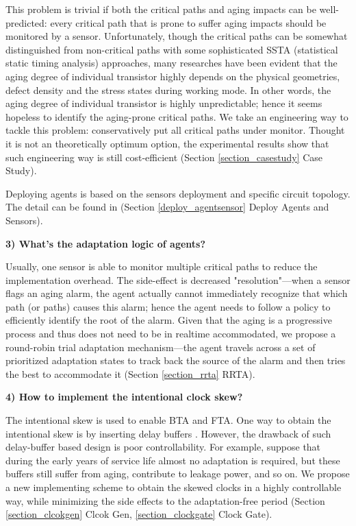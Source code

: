 This problem is trivial if both the critical paths and aging impacts can be well-predicted: every critical path that is prone to suffer aging impacts should be monitored by a sensor. Unfortunately, though the critical paths can be somewhat distinguished from non-critical paths with some sophisticated SSTA (statistical static timing analysis) approaches, many researches have been evident that the aging degree of individual transistor highly depends on the physical geometries, defect density and the stress states during working mode. In other words, the aging degree of individual transistor is highly unpredictable; hence it seems hopeless to identify the aging-prone critical paths. We take an engineering way to tackle this problem: conservatively put all critical paths under monitor. Thought it is not an theoretically optimum option, the experimental results show that such engineering way is still cost-efficient (Section \ref{section_casestudy} Case Study).

Deploying agents is based on the sensors deployment and specific circuit topology. The detail can be found in (Section \ref{deploy_agentsensor} Deploy Agents and Sensors).

{\bf 3) What's the adaptation logic of agents?}

Usually, one sensor is able to monitor multiple critical paths to reduce the implementation overhead. The side-effect is decreased "resolution"---when a sensor flags an aging alarm, the agent actually cannot immediately recognize that which path (or paths) causes this alarm; hence the agent needs to follow a policy to efficiently identify the root of the alarm. Given that the aging is a progressive process and thus does not need to be in realtime accommodated, we propose a round-robin trial adaptation mechanism---the agent travels across a set of prioritized adaptation states to track back the source of the alarm and then tries the best to accommodate it (Section \ref{section_rrta} RRTA).


{\bf 4) How to implement the intentional clock skew?}

The intentional skew is used to enable BTA and FTA.  One way to obtain the intentional skew is by inserting delay buffers \cite{Recycle_07}. However, the drawback of such delay-buffer based design is poor controllability. For example, suppose that during the early years of service life almost no adaptation is required, but these buffers still suffer from aging, contribute to leakage power, and so on. We propose a new implementing scheme to obtain the skewed clocks in a highly controllable way, while minimizing the side effects to the adaptation-free period (Section \ref{section_clcokgen} Clcok Gen, \ref{section_clockgate} Clock Gate).


